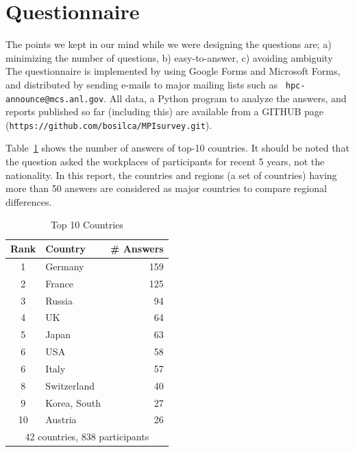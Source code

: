 \documentclass[sigconf,nonacm]{acmart}
\begin{document}
\section{Questionnaire}

The points we kept in our mind while we were designing the
questions are; a) minimizing the number of questions, b) easy-to-answer,
c) avoiding ambiguity
The questionnaire is implemented by using Google Forms and Microsoft
Forms, and distributed
by sending e-mails to major mailing lists such as {\tt
  hpc-announce@mcs.anl.gov}. 
All data, a Python program to analyze the answers, and reports
published so far (including this) are available from a GITHUB page
({\tt https://github.com/bosilca/MPIsurvey.git}).  

Table~\ref{tab:countries} shows the number of answers of top-10
countries. It should be noted that the question asked the
workplaces of participants for recent 5 years, not the nationality.
In this report, the countries and regions (a set of countries)
having more than 50 answers are considered as major countries to
compare regional differences.

{\small
\begin{table}[htb]%
\begin{center}%
\caption{Top 10 Countries}\label{tab:countries}%
\begin{tabular}{c|l|r}%
\hline%
Rank & Country & \# Answers \hspace{5mm} \\%
\hline%
1 & Germany 	& 159 \hspace{8mm} \\%
2 & France 	& 125 \hspace{8mm} \\%
3 & Russia 	& 94 \hspace{8mm} \\%
4 & UK 		& 64 \hspace{8mm} \\%
5 & Japan 	& 63 \hspace{8mm} \\%
6 & USA 		& 58 \hspace{8mm} \\%
6 & Italy 		& 57 \hspace{8mm} \\%
\hline
8 & Switzerland & 40 \hspace{8mm} \\%
9 & Korea, South & 27 \hspace{8mm} \\%
10 & Austria 	& 26 \hspace{8mm} \\%
\hline%
\multicolumn{3}{c}{42 countries, 838 participants} \\%
\end{tabular}%
\end{center}%
\end{table}%
}
\end{document}
